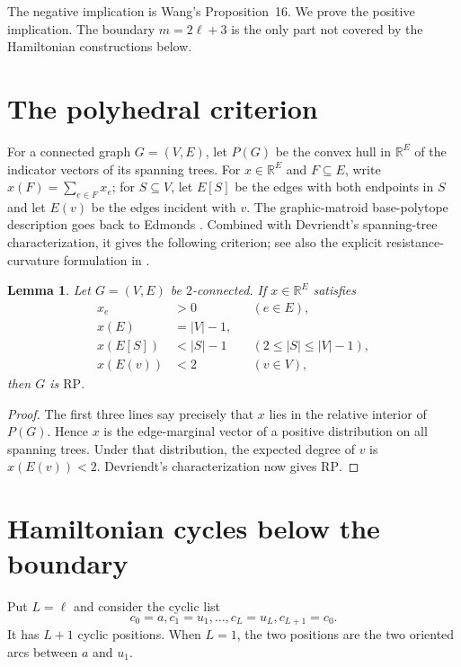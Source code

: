 \documentclass[11pt]{article}
\newtheorem{lemma}[theorem]{Lemma}
\newcommand{\RP}{\mathrm{RP}}
\begin{document}
The negative implication is Wang's Proposition~16.  We prove the positive
implication.  The boundary $m=2\ell+3$ is the only part not covered by the
Hamiltonian constructions below.

\section{The polyhedral criterion}

For a connected graph $G=(V,E)$, let $P(G)$ be the convex hull in
$\mathbb R^E$ of the indicator vectors of its spanning trees.  For
$x\in\mathbb R^E$ and $F\subseteq E$, write $x(F)=\sum_{e\in F}x_e$; for
$S\subseteq V$, let $E[S]$ be the edges with both endpoints in $S$ and let
$E(v)$ be the edges incident with $v$.  The graphic-matroid base-polytope
description goes back to Edmonds \cite{Edmonds1971}.  Combined with
Devriendt's spanning-tree characterization, it gives the following criterion;
see also the explicit resistance-curvature formulation in
\cite{Devriendt2026,AgrahariEtAl2026}.

\begin{lemma}\label{lem:criterion}
Let $G=(V,E)$ be $2$-connected.  If $x\in\mathbb R^E$ satisfies
\begin{align*}
 x_e&>0 &&(e\in E),\\
 x(E)&=|V|-1,\\
 x(E[S])&<|S|-1 &&(2\leq |S|\leq |V|-1),\\
 x(E(v))&<2 &&(v\in V),
\end{align*}
then $G$ is \(\RP\).
\end{lemma}

\begin{proof}
The first three lines say precisely that $x$ lies in the relative interior
of $P(G)$.  Hence $x$ is the edge-marginal vector of a positive distribution
on all spanning trees.  Under that distribution, the expected degree of
$v$ is $x(E(v))<2$.  Devriendt's characterization now gives \(\RP\).
\end{proof}

\section{Hamiltonian cycles below the boundary}

Put $L=\ell$ and consider the cyclic list
\[
 c_0=a,c_1=u_1,\ldots,c_L=u_L,c_{L+1}=c_0.
\]
It has $L+1$ cyclic positions.  When $L=1$, the two positions are the two
oriented arcs between $a$ and $u_1$.
\end{document}
